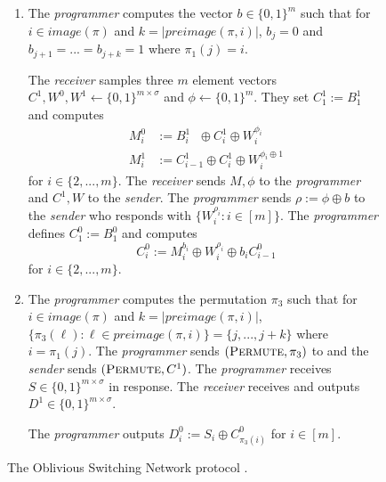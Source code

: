 \begin{figure}[ht]
{\begin{minipage}{0.95\linewidth}
\begin{enumerate}
\begin{enumerate}
					The \emph{programmer}  sends $(\textsc{Permute}, \pi_1)$ to  and the \emph{sender} sends $(\textsc{Permute}, A)$. The \emph{programmer} receives $B^{0}\in \{0,1\}^{m\times \sigma}$ in response and the \emph{receiver} receives $B^{1}\in \{0,1\}^{m\times \sigma}$. 
					
					\item The \emph{programmer}  computes the vector $b\in\{0,1\}^{m}$ such that for $i\in image(\pi)$ and $k=|preimage(\pi, i)|$, $b_j = 0$ and $b_{j+1}=...=b_{j+k}=1$ where $\pi_1(j)=i$.
					
					The \emph{receiver} samples three $m$ element vectors $C^{1}, W^0,W^1\gets \{0,1\}^{m\times \sigma}$ and $\phi\gets\{0,1\}^m$. They set $C^{1}_1:=B^{1}_1$ and computes 
					\begin{align*}
						M^0_i&:= B^1_{i}\ \ \, \oplus C^{1}_i \oplus W^{\phi_i}_i\\
						M^1_i&:= C^1_{i-1} \oplus C^{1}_i \oplus W^{\phi_i\oplus 1}_i
					\end{align*}
					for $i\in \{2,...,m\}$. The \emph{receiver} sends $M,\phi$ to the \emph{programmer} and $C^{1},W$ to the \emph{sender}. The \emph{programmer} sends $\rho:=\phi\oplus b$ to the \emph{sender} who responds with $\{ W^{\rho_i}_i : i\in [m] \}$. The \emph{programmer} defines $C^{0}_1:=B^{0}_1$ and computes 
					$$
						C^{0}_i:= M^{b_i}_i \oplus W^{\rho_i}_i\oplus b_iC^{0}_{i-1}
					$$
					for $i\in \{2,...,m\}$.
					\item The \emph{programmer} computes the permutation $\pi_3$ such that for  $i\in image(\pi)$ and $k=|preimage(\pi, i)|$, $\{\pi_3(\ell) : \ell\in preimage(\pi, i)\}=\{j, ..., j +k\}$ where $i=\pi_1(j)$.	The \emph{programmer} sends $(\textsc{Permute}, \pi_3)$ to  and the \emph{sender} sends $(\textsc{Permute}, C^{1})$.  The \emph{programmer} receives $S\in \{0,1\}^{m\times \sigma }$ in response. The \emph{receiver} receives and outputs $D^{1}\in \{0,1\}^{m\times \sigma }$.
					
					The \emph{programmer} outputs $D^{0}_i:=S_i\oplus C^{0}_{\pi_3(i)}$ for $i\in [m]$.
				\end{enumerate}
			\end{enumerate}
	\end{minipage}}
	\caption{The Oblivious Switching Network protocol . }
	\label{fig:switching-net}	
\end{figure}





